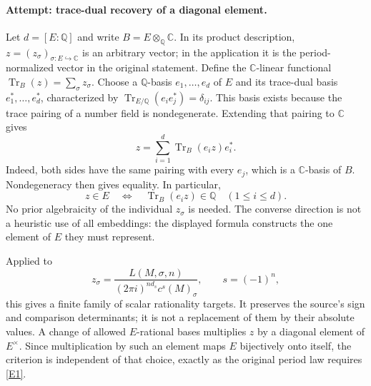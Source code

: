 \documentclass[11pt,a4paper]{article}
\numberwithin{equation}{section}
\newcommand{\Q}{\mathbb{Q}}
\newcommand{\C}{\mathbb{C}}
\newcommand{\eref}[2]{\hyperlink{extra:#1:#2}{[E#2]}}
\begin{document}
\paragraph{Attempt: trace-dual recovery of a diagonal element.}
Let $d=[E:\Q]$ and write $B=E\otimes_{\Q}\C$. In its product description,
$z=(z_\sigma)_{\sigma:E\hookrightarrow\C}$ is an arbitrary vector; in the
application it is the period-normalized vector in the original statement.
Define the $\C$-linear functional
$\operatorname{Tr}_B(z)=\sum_\sigma z_\sigma$.
Choose a $\Q$-basis $e_1,\ldots,e_d$ of $E$ and its trace-dual basis
$e_1^*,\ldots,e_d^*$, characterized by
$\operatorname{Tr}_{E/\Q}(e_i e_j^*)=\delta_{ij}$.
This basis exists because the trace pairing of a number field is
nondegenerate. Extending that pairing to $\C$ gives
\begin{equation}\label{eq71:reconstruct}
 z=\sum_{i=1}^d\operatorname{Tr}_B(e_i z)e_i^*.
\end{equation}
Indeed, both sides have the same pairing with every $e_j$, which is a
$\C$-basis of $B$. Nondegeneracy then gives equality. In particular,
\begin{equation}\label{eq71:criterion}
 z\in E\quad\Longleftrightarrow\quad
 \operatorname{Tr}_B(e_i z)\in\Q\quad(1\leq i\leq d).
\end{equation}
No prior algebraicity of the individual $z_\sigma$ is needed. The converse
direction is not a heuristic use of all embeddings: the displayed formula
constructs the one element of $E$ they must represent.

Applied to
\[
 z_\sigma=\frac{L(M,\sigma,n)}
 {(2\pi i)^{n d_s}c^s(M)_\sigma},\qquad s=(-1)^n,
\]
this gives a finite family of scalar rationality targets. It preserves the
source's sign and comparison determinants; it is not a replacement of them
by their absolute values. A change of allowed $E$-rational bases multiplies
$z$ by a diagonal element of $E^\times$. Since multiplication by such an
element maps $E$ bijectively onto itself, the criterion is independent of
that choice, exactly as the original period law requires \eref{30002589}{1}.
\end{document}
